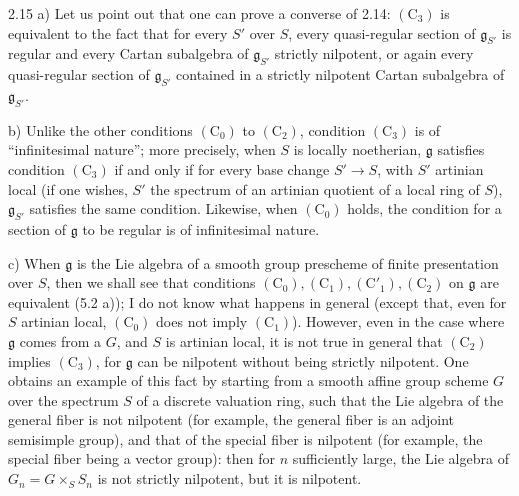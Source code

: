 \begin{remark}{2.15}\label{XIV.2.15}
\noindent a) Let us point out that one can prove a converse of 2.14:
$(\mathrm C_3)$ is equivalent to the fact that for every $S'$ over
$S$, every quasi-regular section of $\mathfrak g_{S'}$ is regular
and every Cartan subalgebra of $\mathfrak g_{S'}$ strictly nilpotent,
or again every quasi-regular section of $\mathfrak g_{S'}$ contained
in a strictly nilpotent Cartan subalgebra of $\mathfrak g_{S'}$.

\noindent b) Unlike the other conditions $(\mathrm C_0)$ to
$(\mathrm C_2)$, condition $(\mathrm C_3)$ is of ``infinitesimal
nature''; more precisely, when $S$ is locally noetherian,
$\mathfrak g$ satisfies condition $(\mathrm C_3)$ if and only if
for every base change $S'\to S$, with $S'$ artinian local (if one
wishes, $S'$ the spectrum of an artinian quotient of a local ring
of $S$), $\mathfrak g_{S'}$ satisfies the same condition. Likewise,
when $(\mathrm C_0)$ holds, the condition for a section of
$\mathfrak g$ to be regular is of infinitesimal nature.

\noindent c) When $\mathfrak g$ is the Lie algebra of a smooth group
prescheme of finite presentation over $S$, then we shall see that
conditions $(\mathrm C_0),(\mathrm C_1),(\mathrm C'_1),(\mathrm C_2)$
on $\mathfrak g$ are equivalent (5.2 a)); I do not know what happens
in general (except that, even for $S$ artinian local,
$(\mathrm C_0)$ does not imply $(\mathrm C_1)$). However, even in
the case where $\mathfrak g$ comes from a $G$, and $S$ is artinian
local, it is not true in general that $(\mathrm C_2)$ implies
$(\mathrm C_3)$, for $\mathfrak g$ can be nilpotent without being
strictly nilpotent. One obtains an example of this fact by starting
from a smooth affine group scheme $G$ over the spectrum $S$ of a
discrete valuation ring, such that the Lie algebra of the general
fiber is not nilpotent (for example, the general fiber is an adjoint
semisimple group), and that of the special fiber is nilpotent
(for example, the special fiber being a vector group): then for
$n$ sufficiently large, the Lie algebra of $G_n=G\times_S S_n$
is not strictly nilpotent, but it is nilpotent.
\end{remark}

